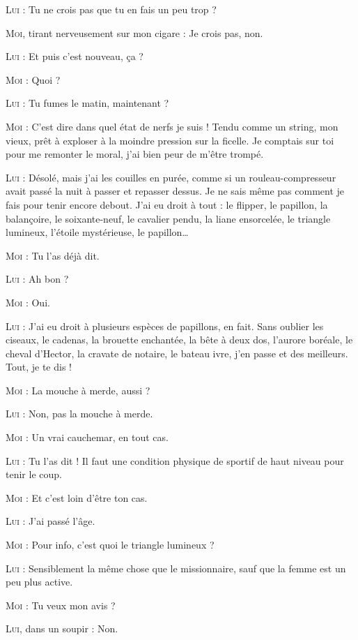 \begin{dialogue}
\textsc{Lui} : Tu ne crois pas que tu en fais un peu trop ?

\textsc{Moi}, tirant nerveusement sur mon cigare : Je crois pas, non.

\textsc{Lui} : Et puis c’est nouveau, ça ?

\textsc{Moi} : Quoi ?

\textsc{Lui} : Tu fumes le matin, maintenant ?

\textsc{Moi} : C’est dire dans quel état de nerfs je suis ! Tendu comme un string, mon vieux, prêt à exploser à la moindre pression sur la ficelle. Je comptais sur toi pour me remonter le moral, j’ai bien peur de m’être trompé.

\textsc{Lui} : Désolé, mais j’ai les couilles en purée, comme si un rouleau-compresseur avait passé la nuit à passer et repasser dessus. Je ne sais même pas comment je fais pour tenir encore debout. J’ai eu droit à tout : le flipper, le papillon, la balançoire, le soixante-neuf, le cavalier pendu, la liane ensorcelée, le triangle lumineux, l’étoile mystérieuse, le papillon…

\textsc{Moi} : Tu l’as déjà dit.

\textsc{Lui} : Ah bon ?

\textsc{Moi} : Oui.

\textsc{Lui} : J’ai eu droit à plusieurs espèces de papillons, en fait. Sans oublier les ciseaux, le cadenas, la brouette enchantée, la bête à deux dos, l’aurore boréale, le cheval d’Hector, la cravate de notaire, le bateau ivre, j’en passe et des meilleurs. Tout, je te dis !

\textsc{Moi} : La mouche à merde, aussi ?

\textsc{Lui} : Non, pas la mouche à merde.

\textsc{Moi} : Un vrai cauchemar, en tout cas.

\textsc{Lui} : Tu l’as dit ! Il faut une condition physique de sportif de haut niveau pour tenir le coup.

\textsc{Moi} : Et c’est loin d’être ton cas.

\textsc{Lui} : J’ai passé l’âge.

\textsc{Moi} : Pour info, c’est quoi le triangle lumineux ?

\textsc{Lui} : Sensiblement la même chose que le missionnaire, sauf que la femme est un peu plus active.

\textsc{Moi} : Tu veux mon avis ?

\textsc{Lui}, dans un soupir : Non.


\end{dialogue}
